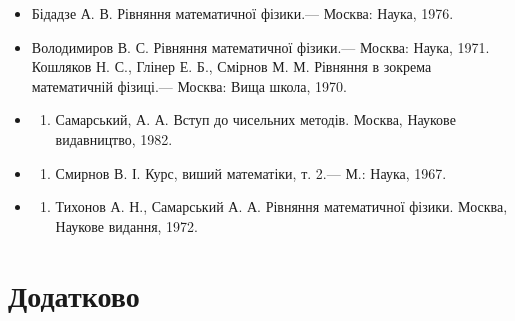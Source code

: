 \documentclass[
]{article}
\providecommand{\tightlist}{%
  \setlength{\itemsep}{0pt}\setlength{\parskip}{0pt}}
\begin{document}
\begin{itemize}
\tightlist
\item
  Бідадзе А. В. Рівняння математичної фізики.--- Москва: Наука, 1976.
\item
  Володимиров В. С. Рівняння математичної фізики.--- Москва: Наука,
  1971. Кошляков Н. С., Глінер Е. Б., Смірнов М. М. Рівняння в зокрема
  математичній фізиці.--- Москва: Вища школа, 1970.
\item
  \begin{enumerate}
  \def\labelenumi{\arabic{enumi}.}
  \setcounter{enumi}{3}
  \tightlist
  \item
    Самарський, А. А. Вступ до чисельних методів. Москва, Наукове
    видавництво, 1982.
  \end{enumerate}
\item
  \begin{enumerate}
  \def\labelenumi{\arabic{enumi}.}
  \setcounter{enumi}{4}
  \tightlist
  \item
    Смирнов В. І. Курс, виший математіки, т. 2.--- М.: Наука, 1967.
  \end{enumerate}
\item
  \begin{enumerate}
  \def\labelenumi{\arabic{enumi}.}
  \setcounter{enumi}{5}
  \tightlist
  \item
    Тихонов А. Н., Самарський А. А. Рівняння математичної фізики.
    Москва, Наукове видання, 1972.
  \end{enumerate}
\end{itemize}

\section{Додатково}\label{ux434ux43eux434ux430ux442ux43aux43eux432ux43e}
\end{document}

